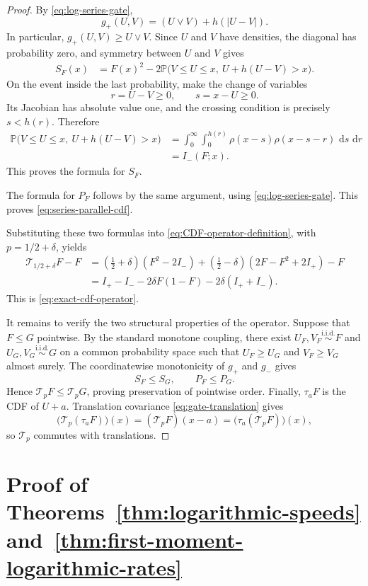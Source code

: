 \documentclass[a4paper,fleqn]{cas-sc}
\newif\ifshowrevisions
\DeclareRobustCommand{\rev}[1]{{\ifshowrevisions\color{blue}\fi#1}}
\numberwithin{equation}{section}
\theoremstyle{plain}
\theoremstyle{definition}
\newcommand{\Pp}{\mathbb P}
\newcommand{\dd}{\,\mathrm d}
\begin{document}
\begin{proof}
By \eqref{eq:log-series-gate},
\[
 g_+(U,V)=(U\vee V)+h(|U-V|).
\]
In particular, $g_+(U,V)\ge U\vee V$.  Since $U$ and $V$ have densities,
the diagonal has probability zero, and
symmetry between $U$ and $V$ gives
\begin{align*}
 S_F(x)
 &=F(x)^2
   -2\Pp\bigl(V\le U\le x,\ U+h(U-V)>x\bigr).
\end{align*}
On the event inside the last probability, make the change of variables
\[
 r=U-V\ge0,
 \qquad
 s=x-U\ge0.
\]
Its Jacobian has absolute value one, and the crossing condition is precisely
$s<h(r)$.  Therefore
\[
\begin{aligned}
 \Pp\bigl(V\le U\le x,\ U+h(U-V)>x\bigr)
 &=\int_0^\infty\int_0^{h(r)}
   \rho(x-s)\rho(x-s-r)\,\dd s\,\dd r\\
 &=I_-(F;x).
\end{aligned}
\]
\rev{This} proves the formula for $S_F$.

The formula for $P_F$ follows by the same argument, using
\eqref{eq:log-series-gate}.  This proves
\eqref{eq:series-parallel-cdf}.

Substituting these two formulas into
\eqref{eq:CDF-operator-definition}, with $p=1/2+\delta$, yields
\begin{align*}
 {\mathcal T_{1/2+\delta}F-F}
 &{=(\tfrac12+\delta)(F^2-2I_-)
   +(\tfrac12-\delta)(2F-F^2+2I_+)-F}\\
 &{=I_+-I_--2\delta F(1-F)-2\delta(I_++I_-).}
\end{align*}
This is \eqref{eq:exact-cdf-operator}.

It remains to verify the two structural properties of the operator.  Suppose
that $F\le G$ pointwise.  By the standard monotone coupling, there exist
$U_F,V_F\stackrel{\mathrm{i.i.d.}}{\sim}F$ and
$U_G,V_G\stackrel{\mathrm{i.i.d.}}{\sim}G$ on a common probability space such
that $U_F\ge U_G$ and $V_F\ge V_G$ almost surely.  The coordinatewise
monotonicity of $g_+$ and $g_-$ gives
\[
 S_F\le S_G,
 \qquad
 P_F\le P_G.
\]
Hence $\mathcal T_pF\le\mathcal T_pG$, proving preservation of pointwise
order.  Finally, $\tau_aF$ is the CDF of $U+a$.  Translation covariance
\eqref{eq:gate-translation} gives
\[
 \bigl(\mathcal T_p(\tau_aF)\bigr)(x)
 =(\mathcal T_pF)(x-a)
 =\bigl(\tau_a(\mathcal T_pF)\bigr)(x),
\]
so $\mathcal T_p$ commutes with translations.
\end{proof}

\section{Proof of Theorems~\ref{thm:logarithmic-speeds}
and~\ref{thm:first-moment-logarithmic-rates}}
\label{sec:ballistic-proof}
\end{document}
